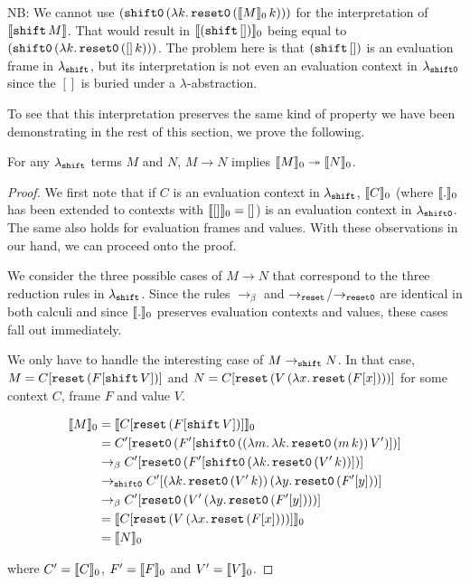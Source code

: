 NB: We cannot use
$(\mathtt{shift0}\,(\lambda k.\, \mathtt{reset0}\,(\llbracket M \rrbracket_0\,k)))$ for the
interpretation of $\llbracket \mathtt{shift}\,M \rrbracket$. That would result in
$\llbracket (\mathtt{shift}\,[]) \rrbracket_0$ being equal to
$(\mathtt{shift0}\,(\lambda k.\, \mathtt{reset0}\,([]\,k)))$. The problem here
is that $(\mathtt{shift}\,[])$ is an evaluation frame in $\lambda_{\mathtt{shift}}$, but
its interpretation is not even an evaluation context in $\lambda_{\mathtt{shift0}}$
since the $[]$ is buried under a $\lambda$-abstraction.

To see that this interpretation preserves the same kind of property we have
been demonstrating in the rest of this section, we prove the following.

\begin{property}
  \label{prop:simul-semo}
  For any $\lambda_{\mathtt{shift}}$ terms $M$ and $N$, $M \to N$ implies $\llbracket M \rrbracket_0
  \twoheadrightarrow \llbracket N \rrbracket_0$.
\end{property}

\begin{proof}
  We first note that if $C$ is an evaluation context in $\lambda_{\mathtt{shift}}$,
  $\llbracket C \rrbracket_0$ (where $\llbracket . \rrbracket_0$ has been extended to contexts with
  $\llbracket [] \rrbracket_0 = []$) is an evaluation context in $\lambda_{\mathtt{shift0}}$. The same
  also holds for evaluation frames and values. With these observations in
  our hand, we can proceed onto the proof.

  We consider the three possible cases of $M \to N$ that correspond to the
  three reduction rules in $\lambda_{\mathtt{shift}}$. Since the rules $\to_\beta$
  and $\to_{\mathtt{reset}}$/$\to_{\mathtt{reset0}}$ are identical in both calculi and since
  $\llbracket . \rrbracket_0$ preserves evaluation contexts and values, these cases fall out
  immediately.

  We only have to handle the interesting case of $M \to_{\mathtt{shift}} N$. In that
  case, $M = C[\mathtt{reset}\,(F[\mathtt{shift}\,V])]$ and $N =
  C[\mathtt{reset}\,(V\,(\lambda x.\, \mathtt{reset}\,(F[x])))]$ for some
  context $C$, frame $F$ and value $V$.

  \NoChapterPrefix
  \begin{align}
    \llbracket M \rrbracket_0 &= \llbracket C[\mathtt{reset}\,(F[\mathtt{shift}\,V])] \rrbracket_0 \\
             &= C'[\mathtt{reset0}\,(F'[\mathtt{shift0}\,((\lambda m.\, \lambda k.\, \mathtt{reset0}\,(m\,k))\,V')])] \\
             &\to_\beta C'[\mathtt{reset0}\,(F'[\mathtt{shift0}\,(\lambda k.\, \mathtt{reset0}\,(V'\,k))])] \\
             &\to_{\mathtt{shift0}} C'[(\lambda k.\, \mathtt{reset0}\,(V'\,k))\,(\lambda y.\, \mathtt{reset0}\,(F'[y]))] \\
             &\to_\beta C'[\mathtt{reset0}\,(V'\,(\lambda y.\, \mathtt{reset0}\,(F'[y])))] \\
             &= \llbracket C[\mathtt{reset}\,(V\,(\lambda x.\, \mathtt{reset}\,(F[x])))] \rrbracket_0 \\
             &= \llbracket N \rrbracket_0
  \end{align}
  \setcounter{equation}{0}
  \ChapterPrefix

  where $C' = \llbracket C \rrbracket_0$, $F' = \llbracket F \rrbracket_0$ and $V' = \llbracket V \rrbracket_0$.
\end{proof}

